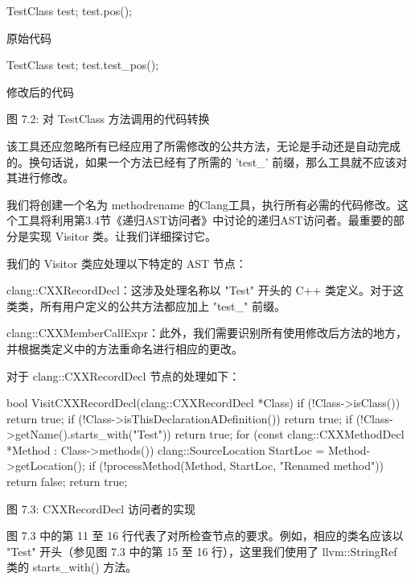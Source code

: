 \begin{cpp}
TestClass test;
test.pos();
\end{cpp}

原始代码

\begin{cpp}
TestClass test;
test.test_pos();
\end{cpp}

修改后的代码


\begin{center}
图 7.2: 对 TestClass 方法调用的代码转换
\end{center}

该工具还应忽略所有已经应用了所需修改的公共方法，无论是手动还是自动完成的。换句话说，如果一个方法已经有了所需的 'test\_' 前缀，那么工具就不应该对其进行修改。

我们将创建一个名为 methodrename 的Clang工具，执行所有必需的代码修改。这个工具将利用第3.4节《递归AST访问者》中讨论的递归AST访问者。最重要的部分是实现 Visitor 类。让我们详细探讨它。


我们的 Visitor 类应处理以下特定的 AST 节点：

clang::CXXRecordDecl：这涉及处理名称以 "Test" 开头的 C++ 类定义。对于这类类，所有用户定义的公共方法都应加上 "test\_" 前缀。

clang::CXXMemberCallExpr：此外，我们需要识别所有使用修改后方法的地方，并根据类定义中的方法重命名进行相应的更改。

对于 clang::CXXRecordDecl 节点的处理如下：

\begin{cpp}
bool VisitCXXRecordDecl(clang::CXXRecordDecl *Class) {
  if (!Class->isClass())
    return true;
  if (!Class->isThisDeclarationADefinition())
    return true;
  if (!Class->getName().starts_with("Test"))
    return true;
  for (const clang::CXXMethodDecl *Method : Class->methods()) {
    clang::SourceLocation StartLoc = Method->getLocation();
    if (!processMethod(Method, StartLoc, "Renamed method"))
      return false;
  }
  return true;
}
\end{cpp}

\begin{center}
图 7.3: CXXRecordDecl 访问者的实现
\end{center}

图 7.3 中的第 11 至 16 行代表了对所检查节点的要求。例如，相应的类名应该以 "Test" 开头（参见图 7.3 中的第 15 至 16 行），这里我们使用了 llvm::StringRef 类的 starts\_with() 方法。

